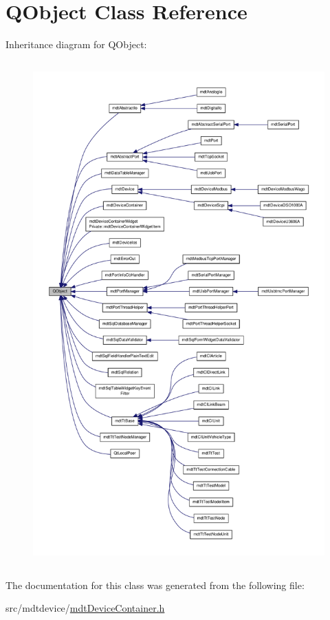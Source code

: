 \hypertarget{class_q_object}{\section{Q\-Object Class Reference}
\label{class_q_object}
}


Inheritance diagram for Q\-Object\-:
\nopagebreak
\begin{figure}[H]
\begin{center}
\leavevmode
\includegraphics[height=550pt]{class_q_object__inherit__graph}
\end{center}
\end{figure}


The documentation for this class was generated from the following file\-:\begin{DoxyCompactItemize}
\item 
src/mdtdevice/\hyperlink{mdt_device_container_8h}{mdt\-Device\-Container.\-h}\end{DoxyCompactItemize}
